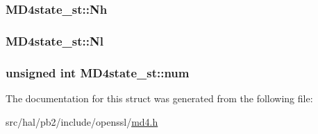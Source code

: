 \subsubsection[{\texorpdfstring{Nh}{Nh}}]{ M\+D4state\+\_\+st\+::\+Nh}\hypertarget{struct_m_d4state__st_a8a0b1c520fc5b0eaeb310263694a46f8}{}\label{struct_m_d4state__st_a8a0b1c520fc5b0eaeb310263694a46f8}
\subsubsection[{\texorpdfstring{Nl}{Nl}}]{ M\+D4state\+\_\+st\+::\+Nl}\hypertarget{struct_m_d4state__st_a7f97311bae9341a6566991805a529f38}{}\label{struct_m_d4state__st_a7f97311bae9341a6566991805a529f38}
\subsubsection[{\texorpdfstring{num}{num}}]{\setlength{\rightskip}{0pt plus 5cm}unsigned int M\+D4state\+\_\+st\+::num}\hypertarget{struct_m_d4state__st_ae7e35fdee3a693c34c4322b00e9a9541}{}\label{struct_m_d4state__st_ae7e35fdee3a693c34c4322b00e9a9541}


The documentation for this struct was generated from the following file\+:\begin{DoxyCompactItemize}
\item 
src/hal/pb2/include/openssl/\hyperlink{md4_8h}{md4.\+h}\end{DoxyCompactItemize}
